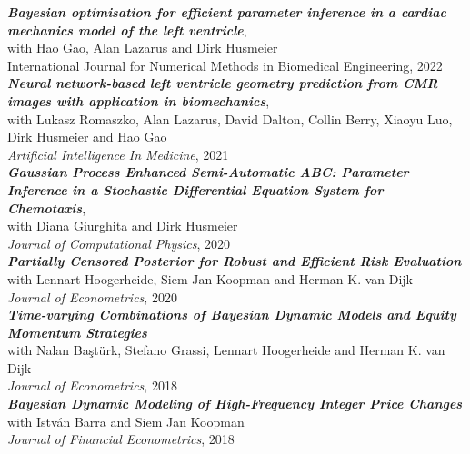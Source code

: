 \documentclass[margin,line]{resume}
\begin{document}
\begin{resume}
\textit{\textbf{Bayesian optimisation for efficient parameter inference in a cardiac mechanics model of the left ventricle}},\\ 
    with Hao Gao, Alan Lazarus and Dirk Husmeier \\
    International Journal for Numerical Methods in Biomedical Engineering, 2022 \vspace{2 mm}\\
%    
\textit{\textbf{Neural network-based left ventricle geometry prediction from CMR images with application in biomechanics}},\\
	with Lukasz Romaszko, Alan Lazarus, David Dalton, Collin Berry, Xiaoyu Luo, Dirk Husmeier and Hao Gao\\
    \textit{Artificial Intelligence In Medicine}, 2021 \vspace{2 mm}\\
%   
\textit{\textbf{Gaussian Process Enhanced Semi-Automatic ABC: Parameter Inference in a Stochastic Differential Equation System for Chemotaxis}},\\ 
    with Diana Giurghita and Dirk Husmeier\\
    \textit{Journal of Computational Physics}, 2020 \vspace{2 mm}\\
%
\textit{\textbf{Partially Censored Posterior for Robust and Efficient Risk Evaluation}}\\
	with Lennart Hoogerheide, Siem Jan Koopman and Herman K. van Dijk\\
	\textit{Journal of Econometrics}, 2020\vspace{2mm}\\ 
\textit{\textbf{Time-varying Combinations of Bayesian Dynamic Models and Equity Momentum Strategies}}\\
	with Nalan Ba\c{s}t\"{u}rk, Stefano Grassi, Lennart Hoogerheide and Herman K. van Dijk\\
	\textit{Journal of Econometrics}, 2018 \vspace{2mm} \\
\textit{\textbf{Bayesian Dynamic Modeling of High-Frequency Integer Price Changes}}\\
	with Istv\'{a}n Barra  and Siem Jan Koopman\\
	\textit{Journal of Financial Econometrics}, 2018\\ 
\vspace{-5mm}


\end{resume}
\end{document}
